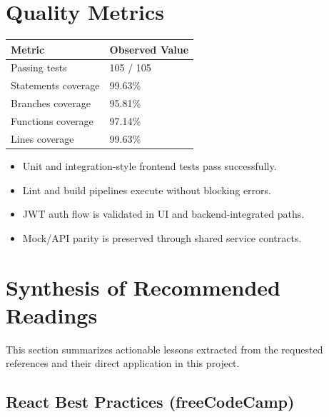 \documentclass[10pt,a4paper,twocolumn]{article}
\begin{document}
\section{Quality Metrics}

\begin{center}
\small
\begin{tabular}{@{}ll@{}}
\toprule
\textbf{Metric} & \textbf{Observed Value} \\
\midrule
Passing tests & 105 / 105 \\
Statements coverage & 99.63\% \\
Branches coverage & 95.81\% \\
Functions coverage & 97.14\% \\
Lines coverage & 99.63\% \\
\bottomrule
\end{tabular}
\end{center}

\begin{resultbox}[title={Verification Snapshot}]
\begin{itemize}
  \item Unit and integration-style frontend tests pass successfully.
  \item Lint and build pipelines execute without blocking errors.
  \item JWT auth flow is validated in UI and backend-integrated paths.
  \item Mock/API parity is preserved through shared service contracts.
\end{itemize}
\end{resultbox}

\section{Synthesis of Recommended Readings}

This section summarizes actionable lessons extracted from the requested
references and their direct application in this project.

\subsection{React Best Practices (freeCodeCamp)}
\end{document}
